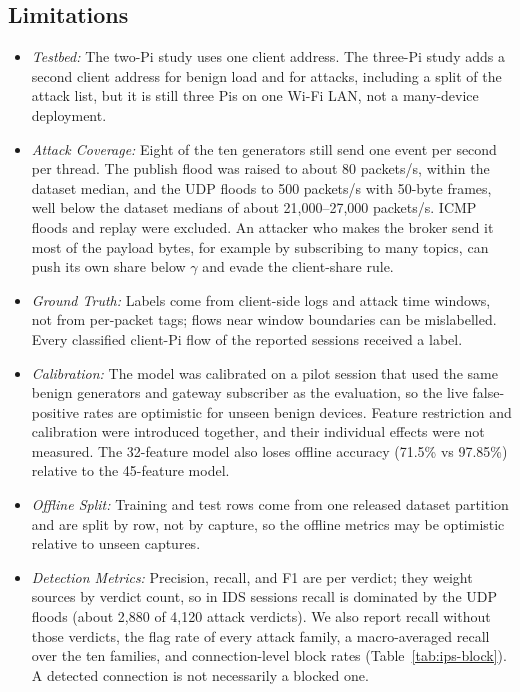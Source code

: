 \documentclass[journal]{IEEEtran}
\begin{document}
\subsection{Limitations}
\label{sec:limits}

\begin{itemize}
  \item \textit{Testbed:} The two-Pi study uses one client address. The three-Pi study adds a second client address for benign load and for attacks, including a split of the attack list, but it is still three Pis on one Wi-Fi LAN, not a many-device deployment.
  \item \textit{Attack Coverage:} Eight of the ten generators still send one event per second per thread. The publish flood was raised to about 80 packets/s, within the dataset median, and the UDP floods to 500 packets/s with 50-byte frames, well below the dataset medians of about 21,000--27,000 packets/s. ICMP floods and replay were excluded. An attacker who makes the broker send it most of the payload bytes, for example by subscribing to many topics, can push its own share below $\gamma$ and evade the client-share rule.
  \item \textit{Ground Truth:} Labels come from client-side logs and attack time windows, not from per-packet tags; flows near window boundaries can be mislabelled. Every classified client-Pi flow of the reported sessions received a label.
  \item \textit{Calibration:} The model was calibrated on a pilot session that used the same benign generators and gateway subscriber as the evaluation, so the live false-positive rates are optimistic for unseen benign devices. Feature restriction and calibration were introduced together, and their individual effects were not measured. The 32-feature model also loses offline accuracy (71.5\% vs 97.85\%) relative to the 45-feature model.
  \item \textit{Offline Split:} Training and test rows come from one released dataset partition and are split by row, not by capture, so the offline metrics may be optimistic relative to unseen captures.
  \item \textit{Detection Metrics:} Precision, recall, and F1 are per verdict; they weight sources by verdict count, so in IDS sessions recall is dominated by the UDP floods (about 2,880 of 4,120 attack verdicts). We also report recall without those verdicts, the flag rate of every attack family, a macro-averaged recall over the ten families, and connection-level block rates (Table~\ref{tab:ips-block}). A detected connection is not necessarily a blocked one.

\end{itemize}
\end{document}
